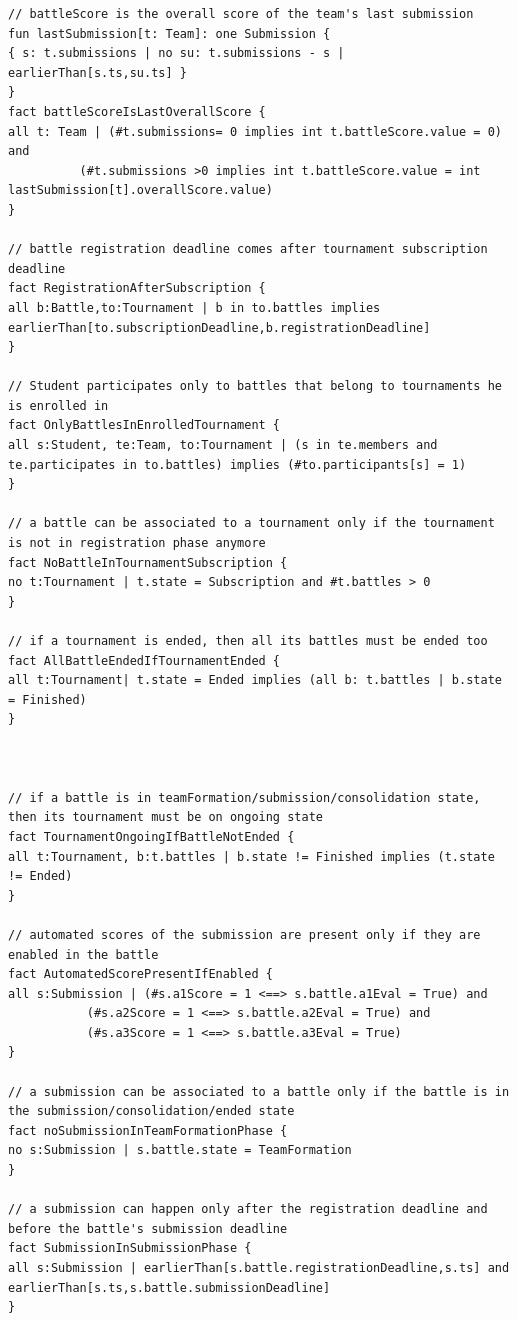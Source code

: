\begin{lstlisting}[language=alloy]
// battleScore is the overall score of the team's last submission
fun lastSubmission[t: Team]: one Submission {
{ s: t.submissions | no su: t.submissions - s | earlierThan[s.ts,su.ts] }
}
fact battleScoreIsLastOverallScore {
all t: Team | (#t.submissions= 0 implies int t.battleScore.value = 0) and
	      (#t.submissions >0 implies int t.battleScore.value = int lastSubmission[t].overallScore.value)
}

// battle registration deadline comes after tournament subscription deadline
fact RegistrationAfterSubscription {
all b:Battle,to:Tournament | b in to.battles implies earlierThan[to.subscriptionDeadline,b.registrationDeadline]
}

// Student participates only to battles that belong to tournaments he is enrolled in
fact OnlyBattlesInEnrolledTournament {
all s:Student, te:Team, to:Tournament | (s in te.members and te.participates in to.battles) implies (#to.participants[s] = 1)
}

// a battle can be associated to a tournament only if the tournament is not in registration phase anymore
fact NoBattleInTournamentSubscription {
no t:Tournament | t.state = Subscription and #t.battles > 0
}

// if a tournament is ended, then all its battles must be ended too
fact AllBattleEndedIfTournamentEnded {
all t:Tournament| t.state = Ended implies (all b: t.battles | b.state = Finished)
}



// if a battle is in teamFormation/submission/consolidation state, then its tournament must be on ongoing state
fact TournamentOngoingIfBattleNotEnded {
all t:Tournament, b:t.battles | b.state != Finished implies (t.state != Ended)
}

// automated scores of the submission are present only if they are enabled in the battle
fact AutomatedScorePresentIfEnabled {
all s:Submission | (#s.a1Score = 1 <==> s.battle.a1Eval = True) and
		   (#s.a2Score = 1 <==> s.battle.a2Eval = True) and
		   (#s.a3Score = 1 <==> s.battle.a3Eval = True) 
}

// a submission can be associated to a battle only if the battle is in the submission/consolidation/ended state 
fact noSubmissionInTeamFormationPhase {
no s:Submission | s.battle.state = TeamFormation
}

// a submission can happen only after the registration deadline and before the battle's submission deadline
fact SubmissionInSubmissionPhase {
all s:Submission | earlierThan[s.battle.registrationDeadline,s.ts] and earlierThan[s.ts,s.battle.submissionDeadline]
}


\end{lstlisting}

